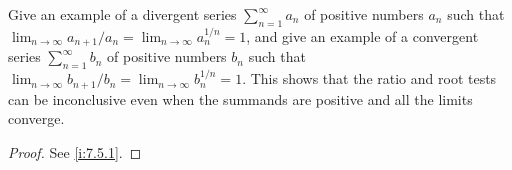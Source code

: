 \begin{ex}\label{i:ex:7.5.3}
  Give an example of a divergent series \(\sum_{n = 1}^\infty a_n\) of positive numbers \(a_n\) such that \(\lim_{n \to \infty} a_{n + 1} / a_n = \lim_{n \to \infty} a_n^{1 / n} = 1\), and give an example of a convergent series \(\sum_{n = 1}^\infty b_n\) of positive numbers \(b_n\) such that \(\lim_{n \to \infty} b_{n + 1} / b_n = \lim_{n \to \infty} b_n^{1 / n} = 1\).
  This shows that the ratio and root tests can be inconclusive even when the summands are positive and all the limits converge.
\end{ex}

\begin{proof}
  See \cref{i:7.5.1}.
\end{proof}
